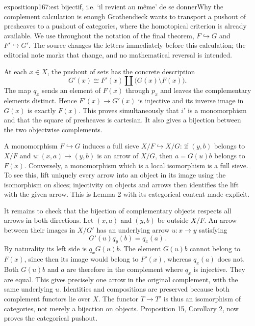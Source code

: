 \begin{dcomment}{exposition}{p167:est bijectif, i.e. ‘il revient au même’ de se donner}{Why the complement calculation is enough}
Grothendieck wants to transport a pushout of presheaves to a pushout of categories, where the homotopical criterion is already available. We use throughout the notation of the final theorem, $F\hookrightarrow G$ and $F'\hookrightarrow G'$. The source changes the letters immediately before this calculation; the editorial note marks that change, and no mathematical reversal is intended.

At each $x\in X$, the pushout of sets has the concrete description
\[
 G'(x)\cong F'(x)\amalg\bigl(G(x)\setminus F(x)\bigr).
\]
The map $q_x$ sends an element of $F(x)$ through $p_x$ and leaves the complementary elements distinct. Hence $F'(x)\to G'(x)$ is injective and its inverse image in $G(x)$ is exactly $F(x)$. This proves simultaneously that $i'$ is a monomorphism and that the square of presheaves is cartesian. It also gives a bijection between the two objectwise complements.

A monomorphism $F\hookrightarrow G$ induces a full sieve $X/F\hookrightarrow X/G$: if $(y,b)$ belongs to $X/F$ and $u:(x,a)\to(y,b)$ is an arrow of $X/G$, then $a=G(u)b$ belongs to $F(x)$. Conversely, a monomorphism which is a local isomorphism is a full sieve. To see this, lift uniquely every arrow into an object in its image using the isomorphism on slices; injectivity on objects and arrows then identifies the lift with the given arrow. This is Lemma 2 with its categorical content made explicit.

It remains to check that the bijection of complementary objects respects all arrows in both directions. Let $(x,a)$ and $(y,b)$ be outside $X/F$. An arrow between their images in $X/G'$ has an underlying arrow $u:x\to y$ satisfying
\[
       G'(u)q_y(b)=q_x(a).
\]
By naturality its left side is $q_xG(u)b$. The element $G(u)b$ cannot belong to $F(x)$, since then its image would belong to $F'(x)$, whereas $q_x(a)$ does not. Both $G(u)b$ and $a$ are therefore in the complement where $q_x$ is injective. They are equal. This gives precisely one arrow in the original complement, with the same underlying $u$. Identities and compositions are preserved because both complement functors lie over $X$. The functor $T\to T'$ is thus an isomorphism of categories, not merely a bijection on objects. Proposition 15, Corollary 2, now proves the categorical pushout.


\end{dcomment}
